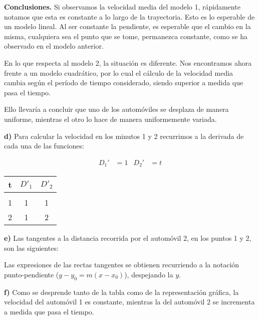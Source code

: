 \textbf{Conclusiones.} Si observamos la velocidad media del modelo 1, rápidamente notamos que esta es constante a lo largo de la trayectoria. Esto es lo esperable de un modelo lineal. Al ser constante la pendiente, es esperable que el cambio en la misma, cualquiera sea el punto que se tome, permanezca constante, como se ha observado en el modelo anterior.

En lo que respecta al modelo 2, la situación es diferente. Nos encontramos ahora frente a un modelo cuadrático, por lo cual el cálculo de la velocidad media cambia según el período de tiempo considerado, siendo superior a medida que pasa el tiempo. 

Ello llevaría a concluir que uno de los automóviles se desplaza de manera uniforme, mientras el otro lo hace de manera uniformemente variada.

\vspace{10pt}

\textbf{d)} Para calcular la velocidad en los minutos 1 y 2 recurrimos a la derivada de cada una de las funciones:

\begin{align*}
    D_1' &= 1 &
    D_2' &= t
\end{align*}

\begin{center}
\begin{tabular}{ c c c }
	t	&	$D'_1$  &   $D'_2$  \\
	\hline \\
	1	&	1     &   1\\	
	2	&	1     &   2\\
    \hline
\end{tabular}
\end{center}

\textbf{e)} Las tangentes a la distancia recorrida por el automóvil 2, en los puntos 1 y 2, son las siguientes:

\begin{center}
\end{center}

Las expresiones de las rectas tangentes se obtienen recurriendo a la notación punto-pendiente ($y-y_0 = m(x-x_0)$), despejando la $y$.

\vspace{10pt}

\textbf{f)} Como se desprende tanto de la tabla como de la representación gráfica, la velocidad del automóvil 1 es constante, mientras la del automóvil 2 se incrementa a medida que pasa el tiempo.
